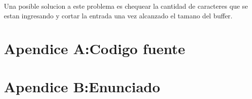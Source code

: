 \documentclass[a4paper,10pt]{article}
\begin{document}
Una posible solucion a este problema es chequear la cantidad de caracteres que se estan ingresando y cortar la entrada una vez alcanzado el tamano del buffer.

\appendix
\section{Apendice A:Codigo fuente}\label{aped.a}
\section{Apendice B:Enunciado}\label{aped.b}

\end{document}
